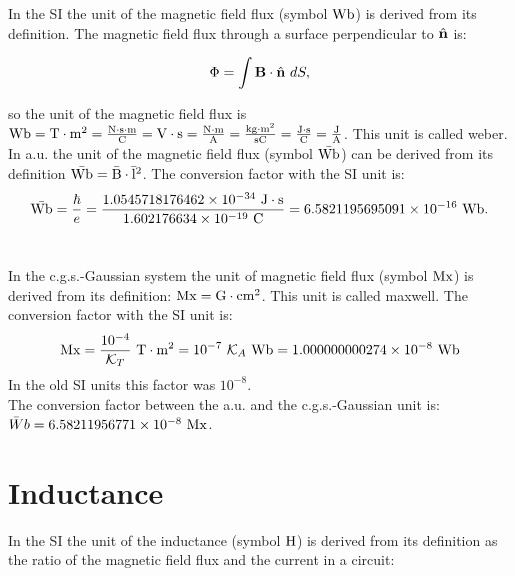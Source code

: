 \documentclass[12pt,a4paper,twoside]{report}
\def\hbarf{1.0545718176462\times 10^{-34}}
\def\e{1.602176634\times 10^{-19}}
\def\barwb{6.5821195695091\times 10^{-16}}
\def\wbtowb{1.000000000274\times 10^{-8}}
\def\barwbcgs{6.58211956771\times 10^{-8}}
\begin{document}
{In the SI the unit of the magnetic field flux (symbol ${\rm Wb}$)
is derived from its definition. The  
magnetic field flux through a surface perpendicular to 
$\hat {\bf n}$ is:

\begin{tcolorbox}
\begin{equation}
\Phi=\int {\bf B}\cdot \hat {\bf n}\ dS,
\end{equation}
\end{tcolorbox}

so the unit of the magnetic field flux is ${\rm Wb}= {\rm T} \cdot {\rm m}^2={{\rm N} \cdot {\rm s}\cdot {\rm m}
\over {\rm C}}={\rm V}\cdot {\rm s}={{\rm N}\cdot {\rm m}\over {\rm A}}={{\rm kg}\cdot {\rm m}^2 \over {\rm s} {\rm C}}=
{{\rm J}\cdot {\rm s}\over {\rm C}}={{\rm J}\over {\rm A}}$. This
unit is called weber.
\\

{\color{web-blue} In a.u. the unit of the magnetic field flux
(symbol ${\rm \bar {Wb}}$) can be derived from its definition
${\rm \bar {Wb}}={\rm \bar B} \cdot {\rm \bar l}^2$. The conversion
factor with the SI unit is:
\begin{equation}
{\rm \bar {Wb}} = {\hbar \over e}=
{\hbarf\ {\rm J}\cdot {\rm s}\over \e\ {\rm C}}=\barwb\ {\rm Wb}.
\end{equation}
\\
}

{\color{orange} In the c.g.s.-Gaussian system the unit of magnetic field
flux (symbol ${\rm Mx}$) is derived from its definition: ${\rm Mx}={\rm G}\cdot {\rm cm}^2$.
This unit is called maxwell.
The conversion factor with the SI unit is:
\begin{equation}
{\rm Mx} = {10^{-4}\over \mathcal{K}_T}\ {\rm T}\cdot {\rm m}^2 = 10^{-7}\ \mathcal{K}_A\ {\rm Wb} =\wbtowb\ {\rm Wb}
\end{equation}
In the old SI units this factor was $10^{-8}$.
}
\\

{\color{green} 
The conversion factor between the a.u. and the c.g.s.-Gaussian unit is: 
$\bar Wb = \barwbcgs\ {\rm Mx}$.
}

\newpage
{\color{coral}\section{Inductance}}
\color{black}

In the SI the unit of the inductance (symbol ${\rm H}$)
is derived from its definition as the ratio of the magnetic
field flux and the current in a circuit:

}
\end{document}
